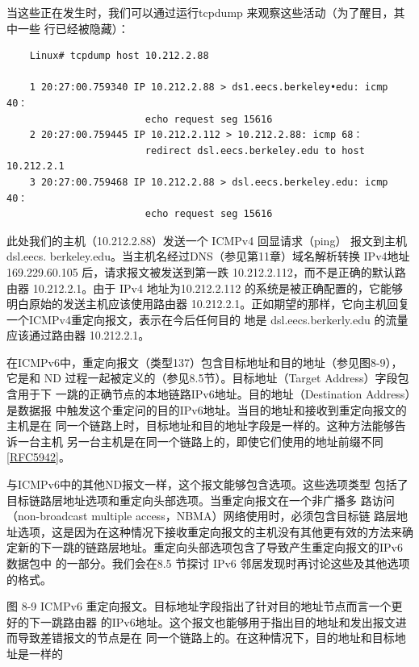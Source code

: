 当这些正在发生时，我们可以通过运行tcpdump 来观察这些活动（为了醒目，其中一些
行已经被隐藏）：

\begin{verbatim}
	Linux# tcpdump host 10.212.2.88

	1 20:27:00.759340 IP 10.212.2.88 > ds1.eecs.berkeley•edu: icmp 40：
						echo request seg 15616
	2 20:27:00.759445 IP 10.212.2.112 > 10.212.2.88: icmp 68：
						redirect dsl.eecs.berkeley.edu to host 10.212.2.1
	3 20:27:00.759468 IP 10.212.2.88 > dsl.eecs.berkeley.edu: icmp 40：
						echo request seg 15616
\end{verbatim}

此处我们的主机（10.212.2.88）发送一个 ICMPv4 回显请求（ping） 报文到主机 dsl.eecs.
berkeley.edu。当主机名经过DNS（参见第11章）域名解析转换 IPv4地址169.229.60.105
后，请求报文被发送到第一跌 10.212.2.112，而不是正确的默认路由器 10.212.2.1。由于 IPv4
地址为10.212.2.112 的系统是被正确配置的，它能够明白原始的发送主机应该使用路由器
10.212.2.1。正如期望的那样，它向主机回复一个ICMPv4重定向报文，表示在今后任何目的
地是 dsl.eecs.berkerly.edu 的流量应该通过路由器 10.212.2.1。

在ICMPv6中，重定向报文（类型137）包含目标地址和目的地址（参见图8-9），它是和
ND 过程一起被定义的（参见8.5节）。目标地址（Target Address）字段包含用于下
一跳的正确节点的本地链路IPv6地址。目的地址（Destination Address）是数据报
中触发这个重定问的目的IPv6地址。当目的地址和接收到重定向报文的主机是在
同一个链路上时，目标地址和目的地址字段是一样的。这种方法能够告诉一台主机
另一台主机是在同一个链路上的，即使它们使用的地址前缀不同\href{https://www.rfc-editor.org/rfc/rfc5942}{[RFC5942]}。

与ICMPv6中的其他ND报文一样，这个报文能够包含选项。这些选项类型
包括了目标链路层地址选项和重定向头部选项。当重定向报文在一个非广播多
路访问 （non-broadcast multiple access，NBMA）网络使用时，必须包含目标链
路层地址选项，这是因为在这种情况下接收重定向报文的主机没有其他更有效的方法来确
定新的下一跳的链路层地址。重定向头部选项包含了导致产生重定向报文的IPv6数据包中
的一部分。我们会在8.5 节探讨 IPv6 邻居发现时再讨论这些及其他选项的格式。

图 8-9	ICMPv6 重定向报文。目标地址字段指出了针对目的地址节点而言一个更好的下一跳路由器
的IPv6地址。这个报文也能够用于指出目的地址和发出报文进而导致差错报文的节点是在
同一个链路上的。在这种情况下，目的地址和目标地址是一样的


